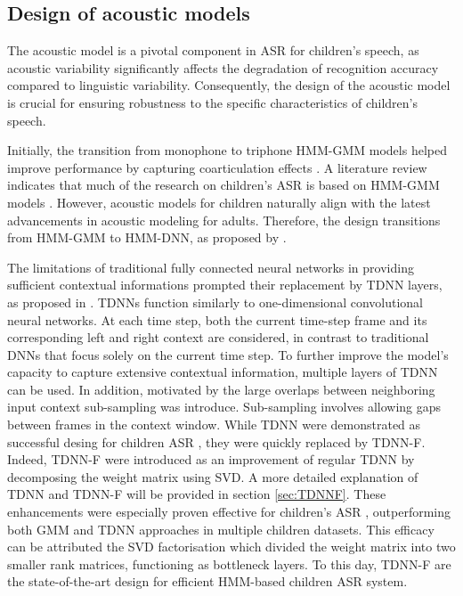 \subsection{Design of acoustic models}%
The acoustic model is a pivotal component in \ac{ASR} for children's speech, as acoustic variability significantly affects the degradation of recognition accuracy compared to linguistic variability. Consequently, the design of the acoustic model is crucial for ensuring robustness to the specific characteristics of children's speech.

Initially, the transition from monophone to triphone \ac{HMM-GMM} models helped improve performance by capturing coarticulation effects \cite{potamianos1997automatic,language_children2}. A literature review \cite{bhardwaj2022automatic} indicates that much of the research on children's \ac{ASR} is based on \ac{HMM-GMM} models \cite{bhardwaj2022automatic}. However, acoustic models for children naturally align with the latest advancements in acoustic modeling for adults. Therefore, the design transitions from \ac{HMM-GMM} to \ac{HMM-DNN}, as proposed by \cite{TFchildren}.


The limitations of traditional fully connected neural networks in providing sufficient contextual informations prompted their replacement by \ac{TDNN} layers, as proposed in \cite{tdnn}. \acp{TDNN} function similarly to one-dimensional convolutional neural networks. At each time step, both the current time-step frame and its corresponding left and right context are considered, in contrast to traditional \acp{DNN} that focus solely on the current time step. To further improve the model's capacity to capture extensive contextual information, multiple layers of \ac{TDNN} can be used. In addition, motivated by the large overlaps between neighboring input context sub-sampling was introduce. Sub-sampling involves allowing gaps between frames in the context window. 
While \ac{TDNN} were demonstrated as successful desing for children \ac{ASR} \cite{kumar2020leveraging}, they were quickly replaced by \ac{TDNN-F}. Indeed, \ac{TDNN-F} were introduced as an improvement of regular \ac{TDNN} \cite{TDNN-F} by decomposing the weight matrix using \ac{SVD}. A more detailed explanation of \ac{TDNN} and \ac{TDNN-F} will be provided in section \ref{sec:TDNNF}. These enhancements were especially proven effective for children's ASR \cite{tdnnf-children}, outperforming both \ac{GMM} and \ac{TDNN} approaches in multiple children datasets. This efficacy can be attributed the \ac{SVD} factorisation which divided the weight matrix into two smaller rank matrices, functioning as bottleneck layers. To this day, \ac{TDNN-F} are the state-of-the-art design for efficient \ac{HMM}-based children \ac{ASR} system.

